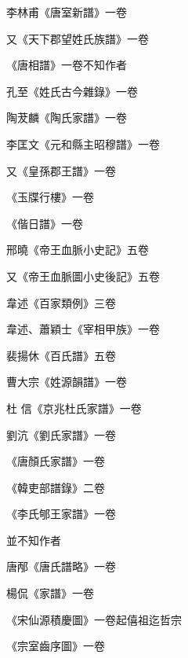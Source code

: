 \begin{pinyinscope}
 李林甫《唐室新譜》一卷



 又《天下郡望姓氏族譜》一卷



 《唐相譜》一卷不知作者



 孔至《姓氏古今雜錄》一卷



 陶茇麟《陶氏家譜》一卷



 李匡文《元和縣主昭穆譜》一卷



 又《皇孫郡王譜》一卷



 《玉牒行樓》一卷



 《偕日譜》一卷



 邢曉《帝王血脈小史記》五卷



 又《帝王血脈圖小史後記》五卷



 韋述《百家類例》三卷



 韋述、蕭穎士《宰相甲族》一卷



 裴揚休《百氏譜》五卷



 曹大宗《姓源韻譜》一卷



 杜
 信《京兆杜氏家譜》一卷



 劉沆《劉氏家譜》一卷



 《唐顏氏家譜》一卷



 《韓吏部譜錄》二卷



 《李氏郇王家譜》一卷



 並不知作者



 唐邴《唐氏譜略》一卷



 楊侃《家譜》一卷



 《宋仙源積慶圖》一卷起僖祖迄哲宗



 《宗室齒序圖》一卷




\end{pinyinscope}

